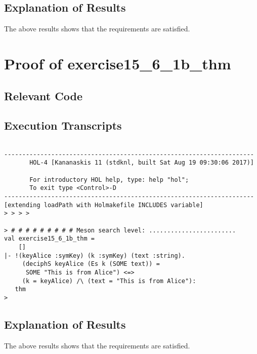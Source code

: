\documentclass{report}
\begin{document}
\subsection{Explanation of Results}
\label{sec:explanation-results-1}
The above results shows that the requirements are satisfied.

\section{Proof of exercise15_6_1b_thm}
\label{sec:proof-1b}

\subsection{Relevant Code}
\label{sec:relevant-code-1b}



\subsection{Execution Transcripts}
\label{sec:exec-transcr-1b}

\setcounter{sessioncount}{0}
\begin{session}
  \begin{scriptsize}
\begin{verbatim}

---------------------------------------------------------------------
       HOL-4 [Kananaskis 11 (stdknl, built Sat Aug 19 09:30:06 2017)]

       For introductory HOL help, type: help "hol";
       To exit type <Control>-D
---------------------------------------------------------------------
[extending loadPath with Holmakefile INCLUDES variable]
> > > > 

> # # # # # # # # # Meson search level: ........................
val exercise15_6_1b_thm =
    []
|- !(keyAlice :symKey) (k :symKey) (text :string).
     (deciphS keyAlice (Es k (SOME text)) =
      SOME "This is from Alice") <=>
     (k = keyAlice) /\ (text = "This is from Alice"):
   thm
>  
\end{verbatim}
  \end{scriptsize}
\end{session}

\subsection{Explanation of Results}
\label{sec:explanation-results-1b}
The above results shows that the requirements are satisfied.
\end{document}
